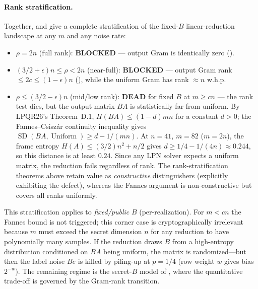 \documentclass[11pt,a4paper]{article}
\theoremstyle{plain}
\theoremstyle{definition}
\begin{document}
\paragraph{Rank stratification.} Together,  and  give a complete stratification of the fixed-$B$ linear-reduction landscape at any $m$ and any noise rate:
\begin{itemize}
\item $\rho = 2n$ (full rank): \textbf{BLOCKED} --- output Gram is identically zero ().
\item $(3/2+\epsilon)n \le \rho < 2n$ (near-full): \textbf{BLOCKED} --- output Gram rank $\le 2c \le (1-\epsilon)n$ (), while the uniform Gram has rank $\approx n$ w.h.p.
\item $\rho \le (3/2-\epsilon)n$ (mid/low rank): \textbf{DEAD} for fixed $B$ at $m \ge cn$ --- the rank test dies, but the output matrix $BA$ is statistically far from uniform. By LPQR26's Theorem~D.1, $H(BA) \le (1-d)mn$ for a constant $d > 0$; the Fannes--Csisz\'{a}r continuity inequality gives $\operatorname{SD}(BA, \operatorname{Uniform}) \ge d - 1/(mn)$. At $n=41$, $m=82$ ($m=2n$), the frame entropy $H(A) \le (3/2)n^2 + n/2$ gives $d \ge 1/4 - 1/(4n) \approx 0.244$, so this distance is at least $0.24$. Since any LPN solver expects a uniform matrix, the reduction fails regardless of rank. The rank-stratification theorems above retain value as \emph{constructive} distinguishers (explicitly exhibiting the defect), whereas the Fannes argument is non-constructive but covers all ranks uniformly.
\end{itemize}
This stratification applies to \emph{fixed/public} $B$ (per-realization). For $m < cn$ the Fannes bound is not triggered; this corner case is cryptographically irrelevant because $m$ must exceed the secret dimension $n$ for any reduction to have polynomially many samples. If the reduction draws $B$ from a high-entropy distribution conditioned on $BA$ being uniform, the matrix is randomized---but then the label noise $Be$ is killed by piling-up at $p=1/4$ (row weight $w$ gives bias $2^{-w}$). The remaining regime is the secret-$B$ model of , where the quantitative trade-off is governed by the Gram-rank transition.
\end{document}
